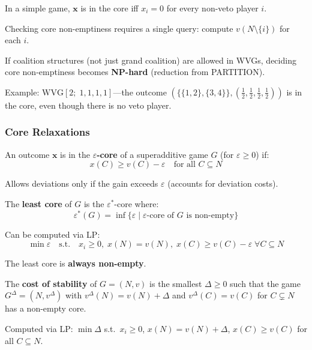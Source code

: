 \begin{thmbox}
In a simple game, $\mathbf{x}$ is in the core iff $x_i = 0$ for every non-veto player $i$.

Checking core non-emptiness requires a single query: compute $v(N \setminus \{i\})$ for each $i$.
\end{thmbox}

\begin{tipbox}
If coalition structures (not just grand coalition) are allowed in WVGs, deciding core non-emptiness becomes \textbf{NP-hard} (reduction from PARTITION).

Example: $\text{WVG}[2;\; 1,1,1,1]$---the outcome $(\{\{1,2\},\{3,4\}\}, (\frac{1}{2}, \frac{1}{2}, \frac{1}{2}, \frac{1}{2}))$ is in the core, even though there is no veto player.
\end{tipbox}

\separator

\subsubsection{Core Relaxations}

\begin{defbox}
An outcome $\mathbf{x}$ is in the \textbf{$\varepsilon$-core} of a superadditive game $G$ (for $\varepsilon \geq 0$) if:
\[
x(C) \geq v(C) - \varepsilon \quad \text{for all } C \subseteq N
\]

Allows deviations only if the gain exceeds $\varepsilon$ (accounts for deviation costs).
\end{defbox}

\begin{defbox}
The \textbf{least core} of $G$ is the $\varepsilon^*$-core where:
\[
\varepsilon^*(G) = \inf\{\varepsilon \mid \varepsilon\text{-core of } G \text{ is non-empty}\}
\]

Can be computed via LP:
\[
\min \varepsilon \quad \text{s.t.} \quad x_i \geq 0,\; x(N) = v(N),\; x(C) \geq v(C) - \varepsilon \;\forall C \subseteq N
\]

The least core is \textbf{always non-empty}.
\end{defbox}

\begin{defbox}
The \textbf{cost of stability} of $G = (N, v)$ is the smallest $\Delta \geq 0$ such that the game $G^\Delta = (N, v^\Delta)$ with $v^\Delta(N) = v(N) + \Delta$ and $v^\Delta(C) = v(C)$ for $C \subsetneq N$ has a non-empty core.

Computed via LP: $\min \Delta$ s.t.\ $x_i \geq 0$, $x(N) = v(N) + \Delta$, $x(C) \geq v(C)$ for all $C \subseteq N$.
\end{defbox}


